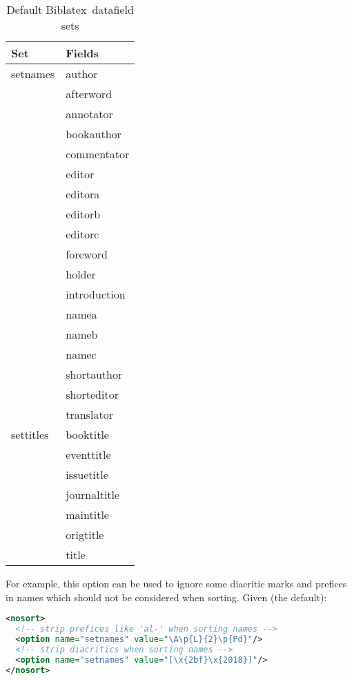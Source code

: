 \documentclass{ltxdockit}
\newcommand*{\biblatex}{Biblatex\xspace}
\begin{document}
\begin{table}
\begin{center}
\small
\begin{tabular}{ll}
\toprule
Set & Fields\\
\midrule
setnames & author\\
          & afterword\\
          & annotator\\
          & bookauthor\\
          & commentator\\
          & editor\\
          & editora\\
          & editorb\\
          & editorc\\
          & foreword\\
          & holder\\
          & introduction\\
          & namea\\
          & nameb\\
          & namec\\
          & shortauthor\\
          & shorteditor\\
          & translator\\
settitles & booktitle\\
           & eventtitle\\
           & issuetitle\\
           & journaltitle\\
           & maintitle\\
           & origtitle\\
           & title\\
\bottomrule
\end{tabular}
\end{center}
\caption{Default \biblatex\ datafield sets}
\label{tab:nst}
\end{table}

For example, this option can be used to ignore some diacritic marks and prefices
in names which should not be considered when sorting. Given (the default):

\begin{lstlisting}[language=xml]
<nosort>
  <!-- strip prefices like 'al-' when sorting names -->
  <option name="setnames" value="\A\p{L}{2}\p{Pd}"/>
  <!-- strip diacritics when sorting names -->
  <option name="setnames" value="[\x{2bf}\x{2018}]"/>
</nosort>
\end{lstlisting}
\end{document}
